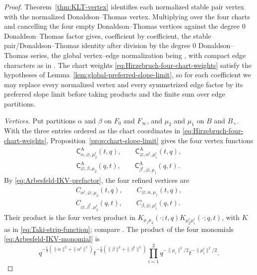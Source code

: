 \documentclass{amsart}
\theoremstyle{definition}
\numberwithin{equation}{section}
\begin{document}
\begin{proof}
Theorem~\ref{thm:KLT-vertex} identifies each normalized stable pair vertex with the normalized Donaldson--Thomas vertex.  Multiplying over the four charts and cancelling the four empty Donaldson--Thomas vertices against the degree \(0\) Donaldson--Thomas factor gives, coefficient by coefficient, the stable pair/Donaldson--Thomas identity after division by the degree \(0\) Donaldson--Thomas series, the global vertex--edge normalization being \cite[equation~(4.17)]{Arbesfeld}, with compact edge characters as in \cite[equation~(4.8)]{Arbesfeld}.  The chart weights \eqref{eq:Hirzebruch-four-chart-weights} satisfy the hypotheses of Lemma~\ref{lem:global-preferred-slope-limit}, so for each coefficient we may replace every normalized vertex and every symmetrized edge factor by its preferred slope limit before taking products and the finite sum over edge partitions.

\emph{Vertices.}  Put partitions \(\alpha\) and \(\beta\) on \(F_0\) and \(F_\infty\), and \(\mu_2\) and \(\mu_1\) on \(B\) and \(B_+\).  With the three entries ordered as the chart coordinates in \eqref{eq:Hirzebruch-four-chart-weights}, Proposition~\ref{prop:chart-slope-limit} gives the four vertex functions
\begin{equation}
\begin{gathered}
 \mathsf C^{\mathrm A}_{\alpha,\varnothing,\mu_2^t}(t,q),\qquad
 \mathsf C^{\mathrm A}_{\varnothing,\alpha^t,\mu_1^t}(t,q),\\
 \mathsf C^{\mathrm A}_{\varnothing,\beta,\mu_2}(q,t),\qquad
 \mathsf C^{\mathrm A}_{\beta^t,\varnothing,\mu_1}(q,t).
\end{gathered}
\label{eq:Hirzebruch-four-Arbesfeld-vertices}
\end{equation}
By \eqref{eq:Arbesfeld-IKV-prefactor}, the four refined vertices are
\begin{equation}
\begin{gathered}
 C_{\alpha^t,\varnothing,\mu_2}(t,q),\qquad
 C_{\varnothing,\alpha,\mu_1}(t,q),\\
 C_{\varnothing,\beta^t,\mu_2^t}(q,t),\qquad
 C_{\beta,\varnothing,\mu_1^t}(q,t).
\end{gathered}
\label{eq:Hirzebruch-four-IKV-vertices}
\end{equation}
Their product is the four vertex product in \(K_{\mu_1\mu_2}(\mathord\cdot;t,q) K_{\mu_2^t\mu_1^t}(\mathord\cdot;q,t)\), with \(K\) as in \eqref{eq:Taki-strip-function}; compare \cite[equations~(3.2)--(3.4)]{TakiRefined}.  The product of the four monomials \eqref{eq:Arbesfeld-IKV-monomial} is
\begin{equation}
 q^{-\frac12(\|\alpha\|^2+\|\alpha^t\|^2)}
 t^{-\frac12(\|\beta\|^2+\|\beta^t\|^2)}
 \prod_{i=1}^2q^{-\|\mu_i\|^2/2}t^{-\|\mu_i^t\|^2/2}.
\label{eq:Hirzebruch-four-vertex-monomials}
\end{equation}


\end{proof}
\end{document}
